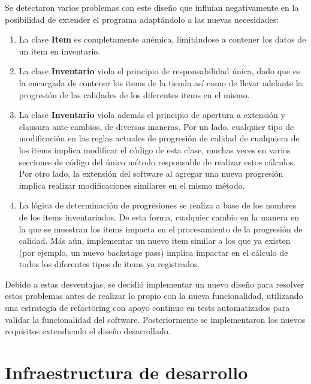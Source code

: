 \documentclass[a4paper,11pt]{article}
\begin{document}
Se detectaron varios problemas con este diseño que influían negativamente en la
posibilidad de extender el programa adaptándolo a las nuevas necesidades:

\begin{enumerate}

  \item La clase \textbf{Item} es completamente anémica, limitándose a contener
    los datos de un item en inventario.

  \item La clase \textbf{Inventario} viola el principio de responsabilidad
    única, dado que es la encargada de contener los items de la tienda así como
    de llevar adelante la progresión de las calidades de los diferentes items
    en el mismo.

  \item La clase \textbf{Inventario} viola además el principio de apertura a
    extensión y clausura ante cambios, de diversas maneras. Por un lado,
    cualquier tipo de modificación en las reglas actuales de progresión de
    calidad de cualquiera de los items implica modificar el código de esta
    clase, muchas veces en varios secciones de código del único método
    responsable de realizar estos cálculos. Por otro lado, la extensión del
    software al agregar una nueva progresión implica realizar modificaciones
    similares en el mismo método.

  \item La lógica de determinación de progresiones se realiza a base de los
    nombres de los items inventariados. De esta forma, cualquier cambio en la
    manera en la que se muestran los items impacta en el procesamiento de la
    progresión de calidad. Más aún, implementar un nuevo item similar a los que
    ya existen (por ejemplo, un nuevo backstage pass) implica impactar en el
    cálculo de todos los diferentes tipos de items ya registrados.

\end{enumerate}

Debido a estas desventajas, se decidió implementar un nuevo diseño para
resolver estos problemas antes de realizar lo propio con la nueva
funcionalidad, utilizando una estrategia de refactoring con apoyo continuo en
tests automatizados para validar la funcionalidad del software. Posteriormente
se implementaron los nuevos requisitos extendiendo el diseño desarrollado.

\section{Infraestructura de desarrollo}
\end{document}
